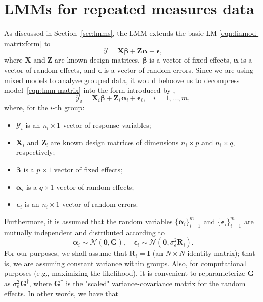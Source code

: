\documentclass[cmfont,usenames,dvipsnames,leqno]{afit-etd}\usepackage[]{graphicx}\usepackage[]{color}
\newcommand{\bc}[1]{\ensuremath{\bm{\mathcal{#1}}}}
\newcommand{\mc}[1]{\ensuremath{\mathcal{#1}}}
\newcommand{\X}{\ensuremath{\bm{X}}}
\newcommand{\Z}{\ensuremath{\bm{Z}}}
\begin{document}
\section{LMMs for repeated measures data}
\label{sec:calibration-lmm-introduction}
As discussed in Section~\ref{sec:lmms}, the \ac{LMM} extends the basic \ac{LM} \eqref{eqn:linmod-matrixform} to 
\begin{equation}
\label{eqn:lmm-matrix}
  \bc{Y} = \X\bm{\beta} + \Z\bm{\alpha} + \bm{\epsilon},
\end{equation}
where $\X$ and $\Z$ are known design matrices, $\bm{\beta}$ is a vector of fixed effects, $\bm{\alpha}$ is a vector of random effects, and $\bm{\epsilon}$ is a vector of random errors. Since we are using mixed models to analyze grouped data, it would behoove us to decompress model~\eqref{eqn:lmm-matrix} into the form introduced by \citet{laird_random_1982},
\begin{equation}
\label{eqn:lmm-laird-ware}
  \bc{Y}_i = \X_i\bm{\beta} + \Z_i\bm{\alpha}_i + \bm{\epsilon}_i, \quad i = 1, \dotsc, m,
\end{equation}
where, for the $i$-th group:
\begin{itemize}
  \item $\bc{Y}_i$ is an $n_i \times 1$ vector of response variables;
  \item $\X_i$ and $\Z_i$ are known design matrices of dimensions $n_i \times p$ and $n_i \times q$, respectively;
  \item $\bm{\beta}$ is a $p \times 1$ vector of fixed effects;
  \item $\bm{\alpha}_i$ is a $q \times 1$ vector of random effects;
  \item $\bm{\epsilon}_i$ is an $n_i \times 1$ vector of random errors.
\end{itemize}
Furthermore, it is assumed that the random variables $\big\{\bm{\alpha}_i\big\}_{i=1}^m$ and $\big\{\bm{\epsilon}_i\big\}_{i=1}^m$ are mutually independent and distributed according to
\begin{equation*}
  \bm{\alpha}_i \sim \mc{N}\left(\bm{0}, \bm{G}\right), \quad
  \bm{\epsilon}_i \sim \mc{N}\left(\bm{0}, \sigma_\epsilon^2\bm{R}_i\right).
\end{equation*}
For our purposes, we shall assume that $\bm{R}_i = \bm{I}$ (an $N \times N$ identity matrix); that is, we are assuming constant variance within groups. Also, for computational purposes (e.g., maximizing the likelihood), it is convenient to reparameterize $\bm{G}$ as $\sigma_\epsilon^2\bm{G}^\dagger$, where $\bm{G}^\dagger$ is the "scaled" variance-covariance matrix for the random effects. In other words, we have that
\end{document}

